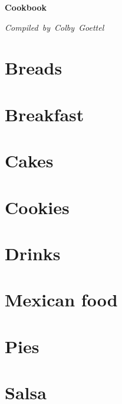 \documentclass{book}
\begin{document}
\begin{titlepage}
    \begin{center}
        \vspace{10pt}
        {\huge \bfseries Cookbook}\\[0.4cm]

        \vfill
        
        \begin{flushright}
            \large{\emph{Compiled~by~Colby~Goettel}}
        \end{flushright}
    \end{center}
\end{titlepage}

\tableofcontents\clearpage

\chapter{Breads}


\chapter{Breakfast}


\chapter{Cakes}


\chapter{Cookies}


\chapter{Drinks}



\chapter{Mexican food}


\chapter{Pies}


\chapter{Salsa}

\end{document}
